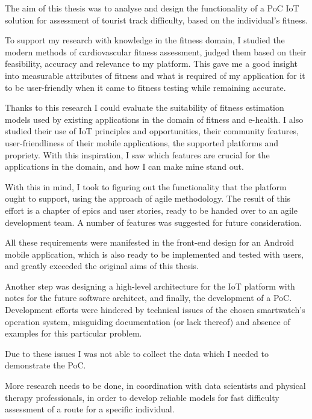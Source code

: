 The aim of this thesis was to analyse and design the functionality of a PoC IoT solution for assessment of tourist track difficulty, based on the individual's fitness.

To support my research with knowledge in the fitness domain, I studied the modern methods of cardiovascular fitness assessment, judged them based on their feasibility, accuracy and relevance to my platform.
This gave me a good insight into measurable attributes of fitness and what is required of my application for it to be user-friendly when it came to fitness testing while remaining accurate.

Thanks to this research I could evaluate the suitability of fitness estimation models used by existing applications in the domain of fitness and e-health.
I also studied their use of IoT principles and opportunities, their community features, user-friendliness of their mobile applications, the supported platforms and propriety.
With this inspiration, I saw which features are crucial for the applications in the domain, and how I can make mine stand out.

With this in mind, I took to figuring out the functionality that the platform ought to support, using the approach of agile methodology.
The result of this effort is a chapter of epics and user stories, ready to be handed over to an agile development team.
A number of features was suggested for future consideration.

All these requirements were manifested in the front-end design for an Android mobile application, which is also ready to be implemented and tested with users, and greatly exceeded the original aims of this thesis.

Another step was designing a high-level architecture for the IoT platform with notes for the future software architect, and finally, the development of a PoC.
Development efforts were hindered by technical issues of the chosen smartwatch's operation system, misguiding documentation (or lack thereof) and absence of examples for this particular problem.

Due to these issues I was not able to collect the data which I needed to demonstrate the PoC.

More research needs to be done, in coordination with data scientists and physical therapy professionals, in order to develop reliable models for fast difficulty assessment of a route for a specific individual.